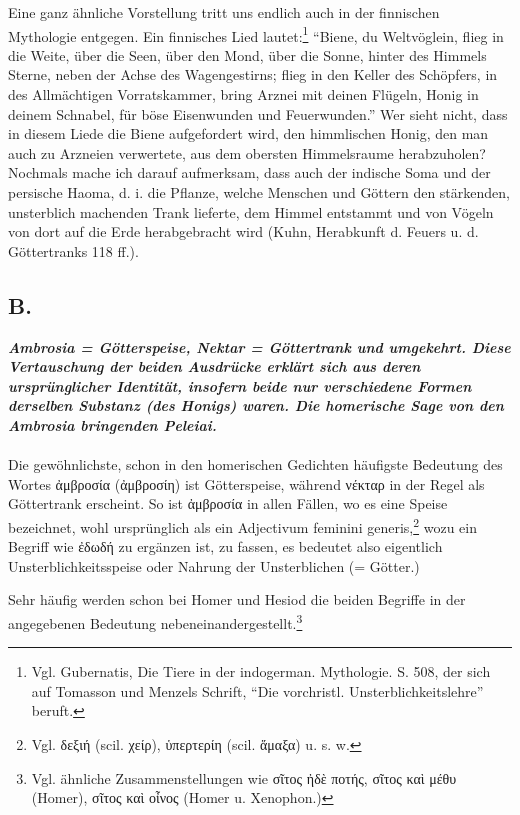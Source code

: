 \documentclass[a4paper, 11pt, oneside]{article}
\begin{document}
Eine ganz ähnliche Vorstellung tritt uns endlich auch in der finnischen Mythologie entgegen. Ein finnisches Lied lautet:\footnote{Vgl. Gubernatis, Die Tiere in der indogerman. Mythologie. S. 508, der sich auf Tomasson und Menzels Schrift, "`Die vorchristl. Unsterblichkeitslehre"' beruft.} "`Biene, du Weltvöglein, flieg in die Weite, über die Seen, über den Mond, über die Sonne, hinter des Himmels Sterne, neben der Achse des Wagengestirns; flieg in den Keller des Schöpfers, in des Allmächtigen Vorratskammer, bring Arznei mit deinen Flügeln, Honig in deinem Schnabel, für böse Eisenwunden und Feuerwunden."' Wer sieht nicht, dass in diesem Liede die Biene aufgefordert wird, den himmlischen Honig, den man auch zu Arzneien verwertete, aus dem obersten Himmelsraume herabzuholen? Nochmals mache ich darauf aufmerksam, dass auch der indische Soma und der persische Haoma, d. i. die Pflanze, welche Menschen und Göttern den stärkenden, unsterblich machenden Trank lieferte, dem Himmel entstammt und von Vögeln von dort auf die Erde herabgebracht wird (Kuhn, Herabkunft d. Feuers u. d. Göttertranks 118 ff.).

\subsection{B.}
\begin{center}
\textbf{\emph{Ambrosia = Götterspeise, Nektar = Göttertrank und umgekehrt. Diese Vertauschung der beiden Ausdrücke erklärt sich aus deren ursprünglicher Identität, insofern beide nur verschiedene Formen derselben Substanz (des Honigs) waren. Die homerische Sage von den Ambrosia bringenden Peleiai.}}
\end{center}
\paragraph{}
Die gewöhnlichste, schon in den homerischen Gedichten häufigste Bedeutung des Wortes ἀμβροσία (ἀμβροσίη) ist Götterspeise, während νέκταρ in der Regel als Göttertrank erscheint. So ist ἀμβροσία in allen Fällen, wo es eine Speise bezeichnet, wohl ursprünglich als ein Adjectivum feminini generis,\footnote{Vgl. δεξιή (scil. χείρ), ὑπερτερίη (scil. ἅμαξα) u. s. w.} wozu ein Begriff wie ἐδωδή zu ergänzen ist, zu fassen, es bedeutet also eigentlich Unsterblichkeitsspeise oder Nahrung der Unsterblichen (= Götter.)

Sehr häufig werden schon bei Homer und Hesiod die beiden Begriffe in der angegebenen Bedeutung nebeneinandergestellt.\footnote{Vgl. ähnliche Zusammenstellungen wie σῖτος ἠδὲ ποτής, σῖτος καὶ μέθυ (Homer), σῖτος καὶ οἶνος (Homer u. Xenophon.)}
\end{document}
